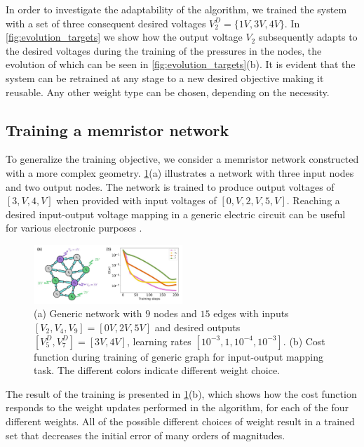 \documentclass[reprint,superscriptaddress,prb,showkeys]{revtex4-2}
\begin{document}
In order to investigate the adaptability of the algorithm, we trained the system with a set of three consequent desired voltages $V_2^D=\{1V, 3V, 4V\}$. In \cref{fig:evolution_targets} we show how the output voltage $V_2$ subsequently adapts to the desired voltages during the training of the pressures in the nodes, the evolution of which can be seen in \cref{fig:evolution_targets}(b). It is evident that the system can be retrained at any stage to a new desired objective making it reusable. Any other weight type can be chosen, depending on the necessity.  


\subsection{\label{sec:train_memr_nw}Training a memristor network}

To generalize the training objective, we consider a memristor network constructed with a more complex geometry. \cref{fig:mse_general}(a) illustrates a network with three input nodes and two output nodes. The network is trained to produce output voltages of $[3,V, 4,V]$ when provided with input voltages of $[0,V, 2,V, 5,V]$.  Reaching a desired input-output voltage mapping in a generic electric circuit can be useful for various electronic purposes \cite{voltage_controlled_oscillator, onchip_powerdistributed}. 

\begin{figure}[h]
    \centering
    \includegraphics[width=0.5\textwidth]{plots/general_network/mse_general.pdf}
    \caption{(a) Generic network with $9$ nodes and $15$ edges with inputs $[V_{2}, V_{4}, V_{9}] = [0V, 2V, 5V]$ and desired outputs $[V_{5}^D, V_{7}^D] = [3V, 4V]$, learning rates $[10^{-3}, 1, 10^{-4}, 10^{-3}]$. (b) Cost function during training of generic graph for input-output mapping task. The different colors indicate different weight choice.}\label{fig:mse_general}
\end{figure} 

The result of the training is presented in \cref{fig:mse_general}(b), which shows how the cost function responds to the weight updates performed in the algorithm, for each of the four different weights. All of the possible different choices of weight result in a trained set that decreases the initial error of many orders of magnitudes. 
\end{document}
